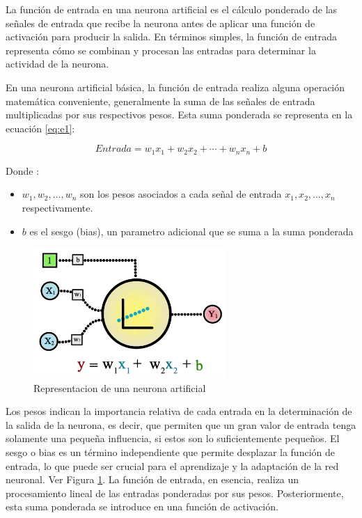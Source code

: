 La función de entrada en una neurona artificial es el cálculo ponderado de las señales de entrada que recibe la neurona antes de aplicar una función de activación para producir la salida. En términos simples, la función de entrada representa cómo se combinan y procesan las entradas para determinar la actividad de la neurona.

En una neurona artificial básica, la función de entrada realiza alguna operación matemática conveniente, generalmente la suma de las señales de entrada multiplicadas por sus respectivos pesos. Esta suma ponderada se representa en la ecuación \ref{eq:e1}:

\begin{equation} \label{eq:e1} 
	Entrada = w_1x_1 + w_2x_2 + \cdots + w_nx_n + b 
\end{equation}

Donde : 
\begin{itemize}
\item $w_1, w_2, \ldots, w_n$ son los pesos asociados a cada señal de entrada $x_1, x_2, \ldots, x_n$ respectivamente.
\item $b$ es el sesgo (bias), un parametro adicional que se suma a la suma ponderada
\end{itemize}

\begin{figure}
	\includegraphics[width=0.65\textwidth]{capitulo2/figuras/an6.png}
	\caption{Representacion de una neurona artificial}
	\label{fig:an6}
\end{figure}

Los pesos indican la importancia relativa de cada entrada en la determinación de la salida de la neurona, es decir, que permiten que un gran valor de entrada tenga solamente una pequeña influencia, si estos son lo suficientemente pequeños. El sesgo o bias es un término independiente que permite desplazar la función de entrada, lo que puede ser crucial para el aprendizaje y la adaptación de la red neuronal. Ver Figura \ref{fig:an6}. La función de entrada, en esencia, realiza un procesamiento lineal de las entradas ponderadas por sus pesos. Posteriormente, esta suma ponderada se introduce en una función de activación.

